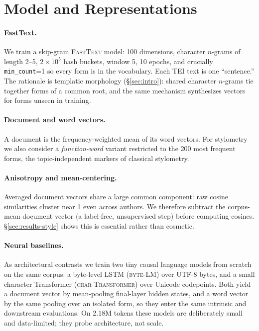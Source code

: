 \documentclass[11pt]{article}
\begin{document}
\section{Model and Representations}
\label{sec:model}

\paragraph{FastText.}
We train a skip-gram \textsc{FastText} model: 100 dimensions, character $n$-grams
of length 2--5, $2\times10^{5}$ hash buckets, window 5, 10 epochs, and crucially
\texttt{min\_count}=1 so every form is in the vocabulary. Each TEI text is one
``sentence.'' The rationale is templatic morphology (\S\ref{sec:intro}): shared
character $n$-grams tie together forms of a common root, and the same mechanism
synthesizes vectors for forms unseen in training.

\paragraph{Document and word vectors.}
A document is the frequency-weighted mean of its word vectors. For stylometry we
also consider a \emph{function-word} variant restricted to the 200 most frequent
forms, the topic-independent markers of classical stylometry.

\paragraph{Anisotropy and mean-centering.}
Averaged document vectors share a large common component: raw cosine
similarities cluster near 1 even across authors. We therefore subtract the
corpus-mean document vector (a label-free, unsupervised step) before computing
cosines. \S\ref{sec:results-style} shows this is essential rather than cosmetic.

\paragraph{Neural baselines.}
As architectural contrasts we train two tiny causal language models from scratch
on the same corpus: a byte-level LSTM (\textsc{byte-LM}) over UTF-8 bytes, and a
small character Transformer (\textsc{char-Transformer}) over Unicode codepoints.
Both yield a document vector by mean-pooling final-layer hidden states, and a
word vector by the same pooling over an isolated form, so they enter the same
intrinsic and downstream evaluations. On 2.18M tokens these models are
deliberately small and data-limited; they probe architecture, not scale.
\end{document}
